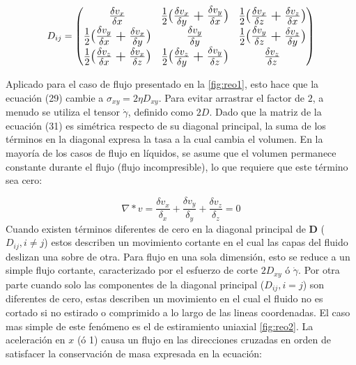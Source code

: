 \begin{equation}\Large
D_{ij} = \left(
\begin{matrix}
%
\frac{\delta v_{x}}{\delta{x}} & \frac{1}{2}(\frac{\delta v_{x}}{\delta{y}}+\frac{\delta v_{y}}{\delta{x}}) & \frac{1}{2}(\frac{\delta v_{x}}{\delta{z}}+\frac{\delta v_{z}}{\delta{x}}) \\
%
\frac{1}{2}(\frac{\delta v_{y}}{\delta{x}}+\frac{\delta v_{x}}{\delta{y}}) & \frac{\delta v_{y}}{\delta{y}} & \frac{1}{2}(\frac{\delta v_{y}}{\delta{z}}+\frac{\delta v_{z}}{\delta{y}}) \\
%
\frac{1}{2}(\frac{\delta v_{z}}{\delta{x}}+\frac{\delta v_{x}}{\delta{z}}) & \frac{1}{2}(\frac{\delta v_{z}}{\delta{y}}+\frac{\delta v_{y}}{\delta{z}}) & \frac{\delta v_{z}}{\delta{z}}
\end{matrix}
\right)
\end{equation}

Aplicado para el caso de flujo presentado en la \autoref{fig:reo1}, esto hace que la ecuación (29) cambie a $\sigma_{xy}=2\eta D_{xy}$. Para evitar arrastrar el factor de $2$, a menudo se utiliza el tensor $\dot{\gamma}$, definido como $2D$. Dado que la matriz de la ecuación (31) es simétrica respecto de su diagonal principal, la suma de los términos en la diagonal expresa la tasa a la cual cambia el volumen. En la mayoría de los casos de flujo en líquidos, se asume que el volumen permanece constante durante el flujo (flujo incompresible), lo que requiere que este término sea cero:

\begin{equation}
\nabla * v = \frac{\delta v_{x}}{\delta_{x}}+\frac{\delta v_{y}}{\delta_{y}}+\frac{\delta v_{z}}{\delta_{z}}=0
\end{equation}
Cuando existen términos diferentes de cero en la diagonal principal de \textbf{D} ($D_{ij},i \neq j$) estos describen un movimiento cortante en el cual las capas del fluido deslizan una sobre de otra. Para flujo en una sola dimensión, esto se reduce a un simple flujo cortante, caracterizado por el esfuerzo de corte $2D_{xy}$ ó $\dot{\gamma}$. Por otra parte cuando solo las componentes de la diagonal principal ($D_{ij},i=j$) son diferentes de cero, estas describen un movimiento en el cual el fluido no es cortado si no estirado o comprimido a lo largo de las lineas coordenadas. El caso mas simple de este fenómeno es el de estiramiento uniaxial \autoref{fig:reo2}. La aceleración en $x$ (ó 1) causa un flujo en las direcciones cruzadas en orden de satisfacer la conservación de masa expresada en la ecuación:

